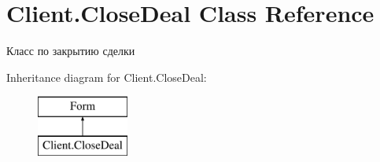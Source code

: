 \hypertarget{class_client_1_1_close_deal}{}\section{Client.\+Close\+Deal Class Reference}
\label{class_client_1_1_close_deal}


Класс по закрытию сделки  


Inheritance diagram for Client.\+Close\+Deal\+:\begin{figure}[H]
\begin{center}
\leavevmode
\includegraphics[height=2.000000cm]{class_client_1_1_close_deal}
\end{center}
\end{figure}
